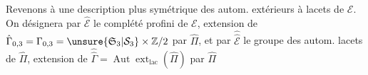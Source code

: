 Revenons à une description plus symétrique des autom. extérieurs à lacets de $\mathcal E$. On désignera par $\hat{\mathcal E}$ le complété profini de $\mathcal E$, extension de $\hat\Gamma_{0,3}=\Gamma_{0,3}=\unsure{\mathfrak S_3|\mathcal S_3}\times\mathbb Z/2$ par $\hat\Pi$, et par $\widehat{\widehat{\mathcal E}}$ le groupe des autom.   lacets de $\hat\Pi$, extension de $\widehat{\widehat\Gamma}=\operatorname{Aut}\operatorname{ext}_{\mathrm{lac}}(\hat\Pi)$ par $\hat\Pi$

